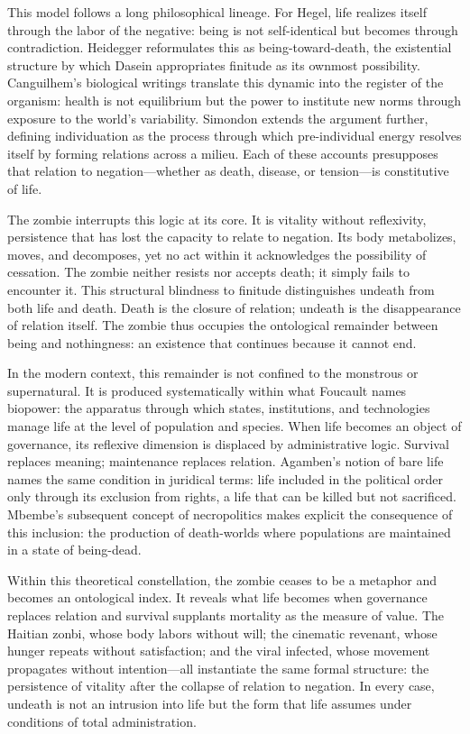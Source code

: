 \documentclass[11pt]{article}
\begin{document}
This model follows a long philosophical lineage.  For Hegel, life realizes itself through the labor of the negative: being is not self-identical but becomes through contradiction.  Heidegger reformulates this as being-toward-death, the existential structure by which Dasein appropriates finitude as its ownmost possibility.  Canguilhem’s biological writings translate this dynamic into the register of the organism: health is not equilibrium but the power to institute new norms through exposure to the world’s variability.  Simondon extends the argument further, defining individuation as the process through which pre-individual energy resolves itself by forming relations across a milieu.  Each of these accounts presupposes that relation to negation—whether as death, disease, or tension—is constitutive of life.  

The zombie interrupts this logic at its core.  It is vitality without reflexivity, persistence that has lost the capacity to relate to negation.  Its body metabolizes, moves, and decomposes, yet no act within it acknowledges the possibility of cessation.  The zombie neither resists nor accepts death; it simply fails to encounter it.  This structural blindness to finitude distinguishes undeath from both life and death.  Death is the closure of relation; undeath is the disappearance of relation itself.  The zombie thus occupies the ontological remainder between being and nothingness: an existence that continues because it cannot end.  

In the modern context, this remainder is not confined to the monstrous or supernatural.  It is produced systematically within what Foucault names biopower: the apparatus through which states, institutions, and technologies manage life at the level of population and species.  When life becomes an object of governance, its reflexive dimension is displaced by administrative logic.  Survival replaces meaning; maintenance replaces relation.  Agamben’s notion of bare life names the same condition in juridical terms: life included in the political order only through its exclusion from rights, a life that can be killed but not sacrificed.  Mbembe’s subsequent concept of necropolitics makes explicit the consequence of this inclusion: the production of death-worlds where populations are maintained in a state of being-dead.  

Within this theoretical constellation, the zombie ceases to be a metaphor and becomes an ontological index.  It reveals what life becomes when governance replaces relation and survival supplants mortality as the measure of value.  The Haitian zonbi, whose body labors without will; the cinematic revenant, whose hunger repeats without satisfaction; and the viral infected, whose movement propagates without intention—all instantiate the same formal structure: the persistence of vitality after the collapse of relation to negation.  In every case, undeath is not an intrusion into life but the form that life assumes under conditions of total administration.  
\end{document}
